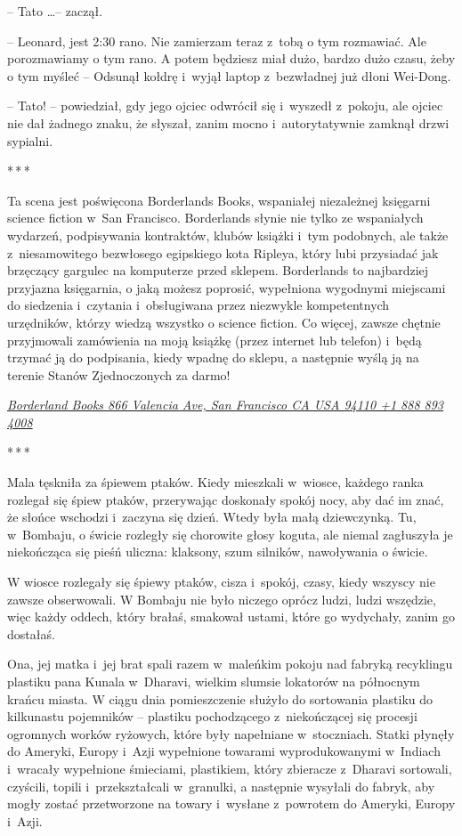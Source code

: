 \documentclass[oneside,polish,11pt,rmheadings]{mwbk}
\newcommand{\threeast}{\par\centerline{*\,*\,*}\medskip\par}
\begin{document}
-- Tato \ldots  -- zaczął. 


-- Leonard, jest 2:30 rano. Nie zamierzam teraz z~tobą o tym rozmawiać. Ale porozmawiamy o tym rano. A potem będziesz miał dużo, bardzo dużo czasu, żeby o tym myśleć -- Odsunął kołdrę i~wyjął laptop z~bezwładnej już dłoni Wei-Dong.  


-- Tato! -- powiedział, gdy jego ojciec odwrócił się i~wyszedł z~pokoju, ale ojciec nie dał żadnego znaku, że słyszał, zanim mocno i~autorytatywnie zamknął drzwi sypialni. 


\bigskip
\threeast

Ta scena jest poświęcona Borderlands Books, wspaniałej niezależnej księgarni science fiction w~San Francisco. Borderlands słynie nie tylko ze wspaniałych wydarzeń, podpisywania kontraktów, klubów książki i~tym podobnych, ale także z~niesamowitego bezwłosego egipskiego kota Ripleya, który lubi przysiadać jak brzęczący gargulec na komputerze przed sklepem. Borderlands to najbardziej przyjazna księgarnia, o jaką możesz poprosić, wypełniona wygodnymi miejscami do siedzenia i~czytania i~obsługiwana przez niezwykle kompetentnych urzędników, którzy wiedzą wszystko o science fiction. Co więcej, zawsze chętnie przyjmowali zamówienia na moją książkę (przez internet lub telefon) i~będą trzymać ją do podpisania, kiedy wpadnę do sklepu, a następnie wyślą ją na terenie Stanów Zjednoczonych za darmo! 


\href{https://www.borderlands-books.com/v2/index.html}{\textit{Borderland Books 866 Valencia Ave, San Francisco CA USA 94110 +1 888 893 4008}} 

\bigskip
\threeast

Mala tęskniła za śpiewem ptaków. Kiedy mieszkali w~wiosce, każdego ranka rozlegał się śpiew ptaków, przerywając doskonały spokój nocy, aby dać im znać, że słońce wschodzi i~zaczyna się dzień. Wtedy była małą dziewczynką. Tu, w~Bombaju, o świcie rozległy się chorowite głosy koguta, ale niemal zagłuszyła je niekończąca się pieśń uliczna: klaksony, szum silników, nawoływania o świcie. 


W wiosce rozlegały się śpiewy ptaków, cisza i~spokój, czasy, kiedy wszyscy nie zawsze obserwowali. W Bombaju nie było niczego oprócz ludzi, ludzi wszędzie, więc każdy oddech, który brałaś, smakował ustami, które go wydychały, zanim go dostałaś. 


Ona, jej matka i~jej brat spali razem w~maleńkim pokoju nad fabryką recyklingu plastiku pana Kunala w~Dharavi, wielkim slumsie lokatorów na północnym krańcu miasta. W ciągu dnia pomieszczenie służyło do sortowania plastiku do kilkunastu pojemników -- plastiku pochodzącego z~niekończącej się procesji ogromnych worków ryżowych, które były napełniane w~stoczniach. Statki płynęły do Ameryki, Europy i~Azji wypełnione towarami wyprodukowanymi w~Indiach i~wracały wypełnione śmieciami, plastikiem, który zbieracze z~Dharavi sortowali, czyścili, topili i~przekształcali w~granulki, a następnie wysyłali do fabryk, aby mogły zostać przetworzone na towary i~wysłane z~powrotem do Ameryki, Europy i~Azji. 
\end{document}
